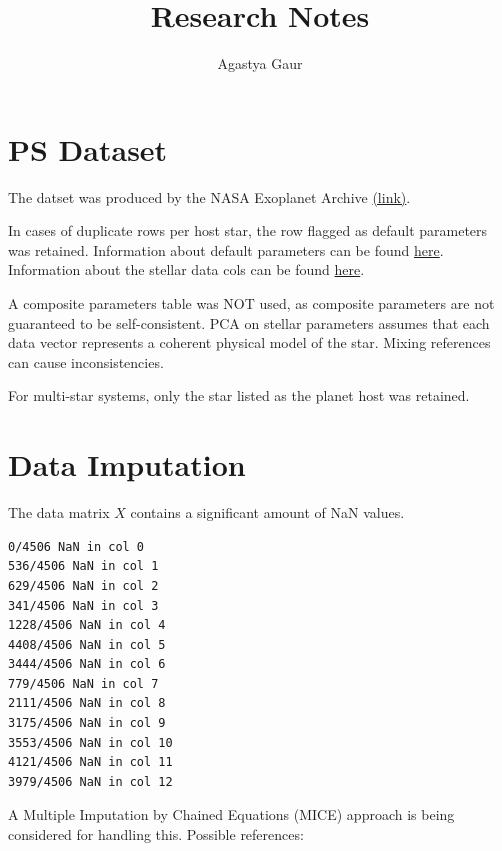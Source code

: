 \documentclass[preprint]{aastex631}
\begin{document}
\title{Research Notes}
\author{Agastya Gaur}

\section{PS Dataset}
The datset was produced by the NASA Exoplanet Archive \href{
http://exoplanetarchive.ipac.caltech.edu}{(link)}.

In cases of duplicate rows per host star, the row flagged as default parameters was retained. Information about default parameters can be found \href{https://exoplanetarchive.ipac.caltech.edu/docs/faq.html}{here}. Information about the stellar data cols can be found \href{https://exoplanetarchive.ipac.caltech.edu/docs/API_STELLARHOSTS_columns.html}{here}.

A composite parameters table was NOT used, as composite parameters are not guaranteed to be self-consistent. PCA on stellar parameters assumes that each data vector represents a coherent physical model of the star. Mixing references can cause inconsistencies.

For multi-star systems, only the star listed as the planet host was retained.

\section{Data Imputation}
The data matrix $X$ contains a significant amount of NaN values.
\begin{verbatim}
0/4506 NaN in col 0
536/4506 NaN in col 1
629/4506 NaN in col 2
341/4506 NaN in col 3
1228/4506 NaN in col 4
4408/4506 NaN in col 5
3444/4506 NaN in col 6
779/4506 NaN in col 7
2111/4506 NaN in col 8
3175/4506 NaN in col 9
3553/4506 NaN in col 10
4121/4506 NaN in col 11
3979/4506 NaN in col 12
\end{verbatim}

A Multiple Imputation by Chained Equations (MICE) approach is being considered for handling this. Possible references: \citep{campbellFullyBayesianApproach2024}


\end{document}

